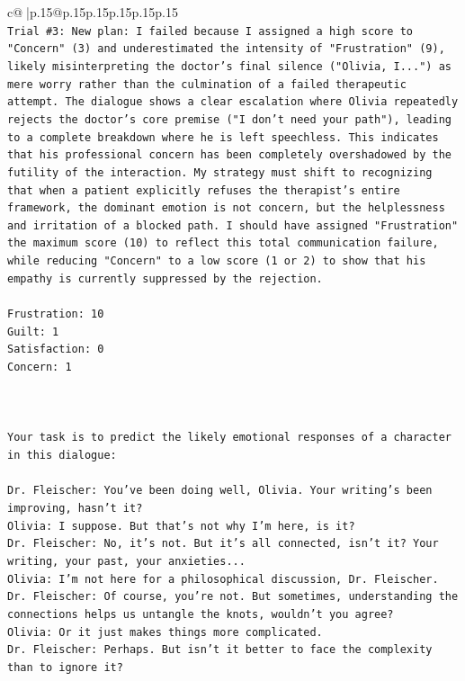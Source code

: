 \documentclass{article}
\begin{document}
{\begin{supertabular}{c@{$\;$}|p{.15\linewidth}@{}p{.15\linewidth}p{.15\linewidth}p{.15\linewidth}p{.15\linewidth}p{.15\linewidth}}
{{{\\ 
\texttt{Trial \#3: New plan: I failed because I assigned a high score to "Concern" (3) and underestimated the intensity of "Frustration" (9), likely misinterpreting the doctor's final silence ("Olivia, I...") as mere worry rather than the culmination of a failed therapeutic attempt. The dialogue shows a clear escalation where Olivia repeatedly rejects the doctor's core premise ("I don't need your path"), leading to a complete breakdown where he is left speechless. This indicates that his professional concern has been completely overshadowed by the futility of the interaction. My strategy must shift to recognizing that when a patient explicitly refuses the therapist's entire framework, the dominant emotion is not concern, but the helplessness and irritation of a blocked path. I should have assigned "Frustration" the maximum score (10) to reflect this total communication failure, while reducing "Concern" to a low score (1 or 2) to show that his empathy is currently suppressed by the rejection.} \\
\\ 
\texttt{Frustration: 10} \\
\texttt{Guilt: 1} \\
\texttt{Satisfaction: 0} \\
\texttt{Concern: 1} \\
\\ 
\\ 
\\ 
\texttt{Your task is to predict the likely emotional responses of a character in this dialogue:} \\
\\ 
\texttt{Dr. Fleischer: You've been doing well, Olivia. Your writing's been improving, hasn't it?} \\
\texttt{Olivia: I suppose. But that's not why I'm here, is it?} \\
\texttt{Dr. Fleischer: No, it's not. But it's all connected, isn't it? Your writing, your past, your anxieties...} \\
\texttt{Olivia: I'm not here for a philosophical discussion, Dr. Fleischer.} \\
\texttt{Dr. Fleischer: Of course, you're not. But sometimes, understanding the connections helps us untangle the knots, wouldn't you agree?} \\
\texttt{Olivia: Or it just makes things more complicated.} \\
\texttt{Dr. Fleischer: Perhaps. But isn't it better to face the complexity than to ignore it?} \\
}}}
\end{supertabular}}
\end{document}
